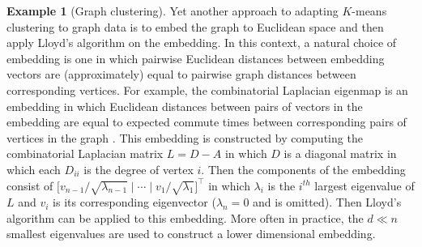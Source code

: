 \documentclass[
  12pt,
]{article}
\theoremstyle{definition}
\theoremstyle{definition}
\newtheorem{example}{Example}[section]
\theoremstyle{definition}
\theoremstyle{definition}
\theoremstyle{remark}
\begin{document}
\begin{example}[Graph clustering]
Yet another approach to adapting $K$-means clustering to graph data is to embed the graph to Euclidean space and then apply Lloyd's algorithm on the embedding. 
In this context, a natural choice of embedding is one in which pairwise Euclidean distances between embedding vectors are (approximately) equal to pairwise graph distances between corresponding vertices. 
For example, the combinatorial Laplacian eigenmap is an embedding in which Euclidean distances between pairs of vectors in the embedding are equal to expected commute times between corresponding pairs of vertices in the graph \citep{vonLuxburg2007}. 
This embedding is constructed by computing the combinatorial Laplacian matrix $L = D - A$ in which $D$ is a diagonal matrix in which each $D_{ii}$ is the degree of vertex $i$. 
Then the components of the embedding consist of $\big[ v_{n-1} / \sqrt{\lambda_{n - 1}} \mid \cdots \mid v_1 / \sqrt{\lambda_1} \big]^\top$ in which $\lambda_i$ is the $i^{th}$ largest eigenvalue of $L$ and $v_i$ is its corresponding eigenvector ($\lambda_n = 0$ and is omitted). 
Then Lloyd's algorithm can be applied to this embedding. 
More often in practice, the $d \ll n$ smallest eigenvalues are used to construct a lower dimensional embedding. 
\end{example}
\end{document}
